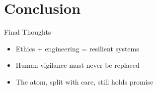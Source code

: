 \documentclass{beamer}
\begin{document}
\section{Conclusion}

\begin{frame}{Final Thoughts}
  \begin{itemize}
    \item Ethics + engineering = resilient systems
    \item Human vigilance must never be replaced
    \item The atom, split with care, still holds promise
  \end{itemize}
\end{frame}
\end{document}
